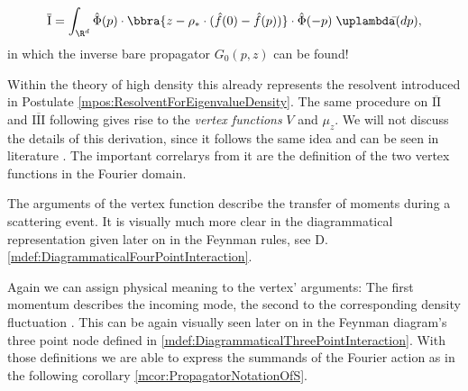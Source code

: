 \[
    \overline{\text{I}} = \int_{\R^d}\hat\Phi(p)\cdot\bbra{z - \rho_*\cdot(\hat f(0) - \hat f(p))}\cdot\hat\Phi(-p)\;\uplambdabar(dp),
\]
in which the inverse bare propagator $G_0(p,z)$ can be found!

Within the theory of high density this already represents the resolvent introduced in Postulate \ref{mpos:ResolventForEigenvalueDensity}. The same procedure on $\overline{\text{II}}$ and $\overline{\text{III}}$ following \cite{paper:Grigera_2011,mth:vogel} gives rise to the \emph{vertex functions} $V$ and $\mu_z$. We will not discuss the details of this derivation, since it follows the same idea and can be seen in literature \cite{paper:Grigera_2011}. The important correlarys from it are the definition of the two vertex functions in the Fourier domain.  


The arguments of the vertex function describe the transfer of moments during a scattering event. It is visually much more clear in the diagrammatical representation given later on in the Feynman rules, see D.\ref{mdef:DiagrammaticalFourPointInteraction}. 


Again we can assign physical meaning to the vertex' arguments: The first momentum describes the incoming mode, the second to the corresponding density fluctuation \cite{mth:vogel}. This can be again visually seen later on in the Feynman diagram's three point node defined in \ref{mdef:DiagrammaticalThreePointInteraction}. With those definitions we are able to express the summands of the Fourier action as in the following corollary \ref{mcor:PropagatorNotationOfS}. 




% 
